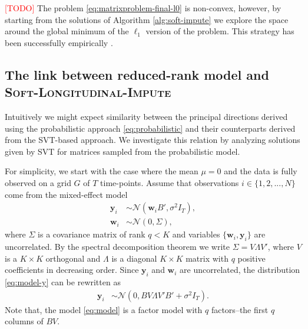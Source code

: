 \documentclass[preprint]{imsart}
\numberwithin{equation}{section}
\theoremstyle{plain}
\newcommand{\cN}{\mathcal{N}}
\newcommand{\tr}[1]{{\textcolor{red}{#1}}}
\newcommand{\by}{\mathbf{y}}
\newcommand{\bw}{\mathbf{w}}
\begin{document}
\tr{[TODO]} The problem \eqref{eq:matrixproblem-final-l0} is non-convex, however, by starting from the solutions of Algorithm \ref{alg:soft-impute} we explore the space around the global minimum of the $\ell_1$ version of the problem. This strategy has been successfully empirically \citep{ge2016matrix}.


\subsection{The link between reduced-rank model and \textsc{Soft-Longitudinal-Impute}}\label{s:the-link}


Intuitively we might expect similarity between the principal directions derived using the probabilistic approach \eqref{eq:probabilistic} and their counterparts derived from the SVT-based approach. We investigate this relation by analyzing solutions given by SVT for matrices sampled from the probabilistic model.

For simplicity, we start with the case where the mean $\mu = 0$ and the data is fully observed on a grid $G$ of $T$ time-points. Assume that observations $i \in \{1,2,...,N\}$ come from the mixed-effect model
\begin{align}
  \by_i &\sim \cN(\bw_i B', \sigma^2 I_T), \label{eq:model-y}\\
  \bw_i &\sim \cN(0 , \Sigma), \label{eq:model-w}
\end{align}
%
where $\Sigma$ is a covariance matrix of rank $q < K$ and variables $\{\bw_i, \by_i\}$ are uncorrelated. By the spectral decomposition theorem we write $\Sigma = V\Lambda V'$, where $V$ is a $K\times K$ orthogonal and $\Lambda$ is a diagonal $K\times K$ matrix with $q$ positive coefficients in decreasing order.
Since $\by_i$ and $\bw_i$ are uncorrelated, the distribution \eqref{eq:model-y} can be rewritten as
\begin{align}
  \by_i &\sim \cN(0, B V \Lambda V'  B' + \sigma^2 I_T). \label{eq:model}
\end{align}
Note that, the model \eqref{eq:model} is a factor model with $q$ factors--the first $q$ columns of $BV$.
\end{document}
